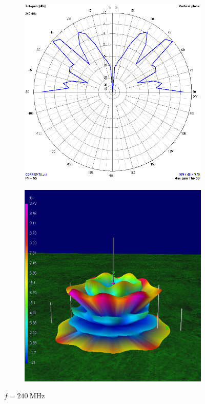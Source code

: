 \begin{figure}[H]
	\begin{subfigure}{0.5\textwidth}
		\includegraphics[scale=0.43]{imagenes/2D_240MHz_tierra.png}
	\end{subfigure}	
	\quad
	\begin{subfigure}{0.5\textwidth}
		\includegraphics[scale=0.43]{imagenes/3D_240MHz_tierra.png}
	\end{subfigure}
	\caption{$f=\SI{240}{\mega\hertz}$}
	\label{fig.radiacion_240M_tierra}
\end{figure}


